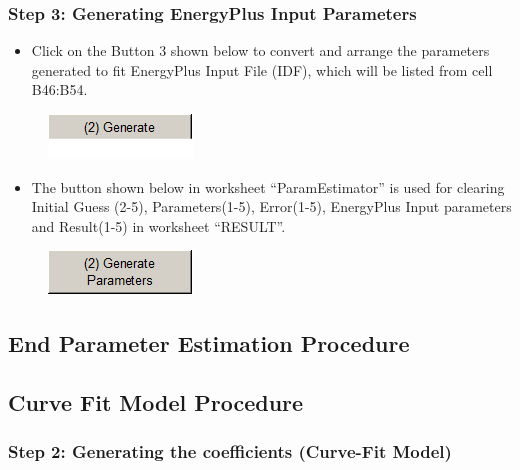 \subsubsection{Step 3: Generating EnergyPlus Input Parameters}\label{step-3-generating-energyplus-input-parameters}

\begin{itemize}
\tightlist
\item
  Click on the Button 3 shown below to convert and arrange the parameters generated to fit EnergyPlus Input File (IDF), which will be listed from cell B46:B54.
\end{itemize}

\begin{figure}[htbp]
\centering
\includegraphics{media/image058.png}
\caption{}
\end{figure}

\begin{itemize}
\tightlist
\item
  The button shown below in worksheet ``ParamEstimator'' is used for clearing Initial Guess (2-5), Parameters(1-5), Error(1-5), EnergyPlus Input parameters and Result(1-5) in worksheet ``RESULT''.
\end{itemize}

\begin{figure}[htbp]
\centering
\includegraphics{media/image059.png}
\caption{}
\end{figure}

\subsection{End Parameter Estimation Procedure}\label{end-parameter-estimation-procedure}

\subsection{Curve Fit Model Procedure}\label{curve-fit-model-procedure}

\subsubsection{Step 2: Generating the coefficients (Curve-Fit Model)}\label{step-2-generating-the-coefficients-curve-fit-model}

